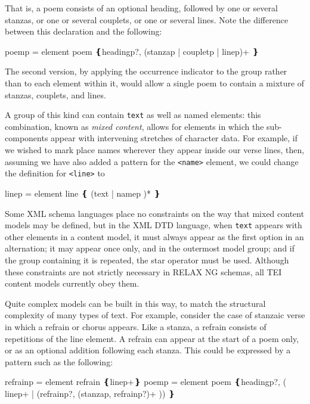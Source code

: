 \par\egroup 
 That is, a poem consists of an optional heading, followed by one or several stanzas, or one or several couplets, or one or several lines. Note the difference between this declaration and the following: \par\hfill\bgroup\exampleFont\vskip 10pt\begin{shaded}
\obeyspaces poem\textunderscore p = element poem\newline
❴heading\textunderscore p?, (stanza\textunderscore p | couplet\textunderscore p | line\textunderscore p)+ ❵\end{shaded}
\par\egroup 
 The second version, by applying the occurrence indicator to the group rather than to each element within it, would allow a single poem to contain a mixture of stanzas, couplets, and lines.\par
A group of this kind can contain \texttt{text} as well as named elements: this combination, known as \textit{mixed content}, allows for elements in which the sub-components appear with intervening stretches of character data. For example, if we wished to mark place names wherever they appear inside our verse lines, then, assuming we have also added a pattern for the \texttt{<name>} element, we could change the definition for \texttt{<line>} to \par\hfill\bgroup\exampleFont\vskip 10pt\begin{shaded}
\obeyspaces line\textunderscore p = element\newline
line ❴ (text | name\textunderscore p )* ❵\end{shaded}
\par\egroup 
\par
Some XML schema languages place no constraints on the way that mixed content models may be defined, but in the XML DTD language, when \texttt{text} appears with other elements in a content model, it must always appear as the first option in an alternation; it may appear once only, and in the outermost model group; and if the group containing it is repeated, the star operator must be used. Although these constraints are not strictly necessary in RELAX NG schemas, all TEI content models currently obey them.\par
Quite complex models can be built in this way, to match the structural complexity of many types of text. For example, consider the case of stanzaic verse in which a refrain or chorus appears. Like a stanza, a refrain consists of repetitions of the line element. A refrain can appear at the start of a poem only, or as an optional addition following each stanza. This could be expressed by a pattern such as the following: \par\hfill\bgroup\exampleFont\vskip 10pt\begin{shaded}
\obeyspaces refrain\textunderscore p = element refrain ❴line\textunderscore p+❵\newline
poem\textunderscore p = element poem   ❴heading\textunderscore p?, ( line\textunderscore p+ | (refrain\textunderscore p?, (stanza\textunderscore p,\newline
refrain\textunderscore p?)+ )) ❵\end{shaded}
